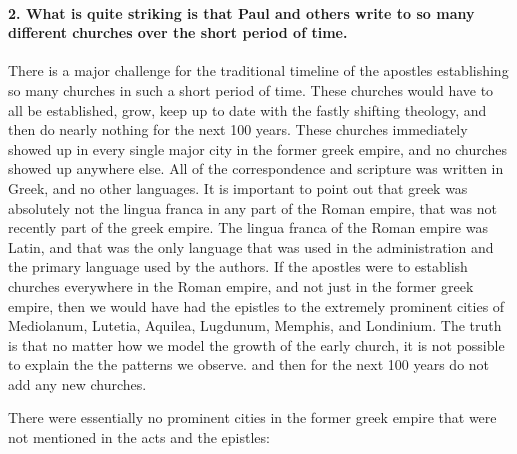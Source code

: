 \paragraph{2.
What is quite striking is that Paul and others write to so many different churches over the short period of time.}\label{par:what-is-quite-striking-is-that-paul-and-others-write-to-so-many-different-churches-over-the-short-period-of-time.}

There is a major challenge for the traditional timeline of the apostles establishing so many churches in such a short period of time.
These churches would have to all be established, grow, keep up to date with the fastly shifting theology, and then do nearly nothing for the next 100 years.
These churches immediately showed up in every single major city in the former greek empire, and no churches showed up anywhere else.
All of the correspondence and scripture was written in Greek, and no other languages.
It is important to point out that greek was absolutely not the lingua franca in any part of the Roman empire, that was not recently part of the greek empire.
The lingua franca of the Roman empire was Latin, and that was the only language that was used in the administration and the primary language used by the authors.
If the apostles were to establish churches everywhere in the Roman empire, and not just in the former greek empire, then we would have had the epistles to the extremely prominent cities of Mediolanum, Lutetia, Aquilea, Lugdunum, Memphis, and Londinium.
The truth is that no matter how we model the growth of the early church, it is not possible to explain the the patterns we observe.
and then for the next 100 years do not add any new churches.

There were essentially no prominent cities in the former greek empire that were not mentioned in the acts and the epistles:

